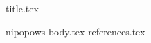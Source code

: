 \documentclass[11pt]{llncs}
\begin{document}
{title.tex}
\begin{abstract}

\end{abstract}
\thispagestyle{plain}
{nipopows-body.tex}
{references.tex}
\end{document}
